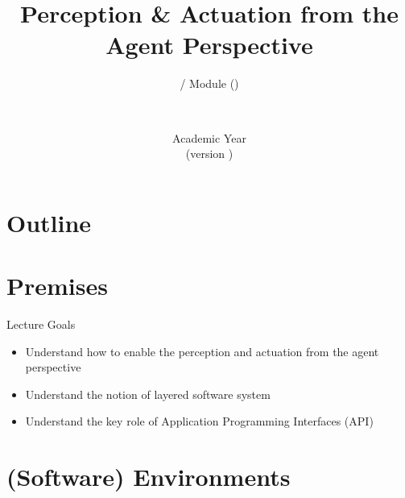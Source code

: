 \documentclass[presentation]{beamer}\mode<presentation>{\usetheme{AMSBolognaFC}}
\title[\currentLab{} -- Perception \& Actuation]{Perception \& Actuation from the Agent Perspective}
\subtitle{\courseName{} / Module \moduleN{} (\courseAcronym)}
\author[\sspeaker{\gcShort}]{\speaker{\gcFull} \\ \gcEmail}
\institute[\disiShort, \uniboShort]{\disi{} (\disiShort)\\\unibo}
\date[A.Y. \academicYear{} (v.\ \version)]{Academic Year \academicYear{}\\(version \version)}
\begin{document}

\frame{\titlepage}

\section*{Outline}
%
\frame[c]{\tableofcontents[hideallsubsections]}

\section{Premises}

\begin{frame}{Lecture Goals}
    \begin{itemize}
        \item Understand how to enable the perception and actuation from the agent perspective
        \item Understand the notion of layered software system
        \item Understand the key role of Application Programming Interfaces (API)
    \end{itemize}
\end{frame}

\section{(Software) Environments}
\end{document}
